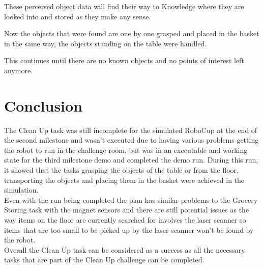 \documentclass[main.tex]{subfiles}
\begin{document}
	\begin{knowledge}
	These perceived object data will find their way to Knowledge where they are looked into and stored as they make any sense.
	\end{knowledge}
    
	\begin{planning}
	Now the objects that were found are one by one grasped and placed in the basket in the same way, the objects standing on the table were handled.
	
	This continues until there are no known objects and no points of interest left anymore.
	\end{planning}
    
	\section{Conclusion}
	The Clean Up task was still incomplete for the simulated RoboCup at the end of the second milestone and wasn't executed due to having various problems getting the robot to run in the challenge room, but was in an executable and working state for the third milestone demo and completed the demo run. During this run, it showed that the tasks grasping the objects of the table or from the floor, transporting the objects and placing them in the basket were achieved in the simulation.\\
	Even with the run being completed the plan has similar problems to the Grocery Storing task with the magnet sensors and there are still potential issues as the way items on the floor are currently searched for involves the laser scanner so items that are too small to be picked up by the laser scanner won't be found by the robot.\\
	Overall the Clean Up task can be considered as a success as all the necessary tasks that are part of the Clean Up challenge can be completed. 
	
	\endgroup
\end{document}
